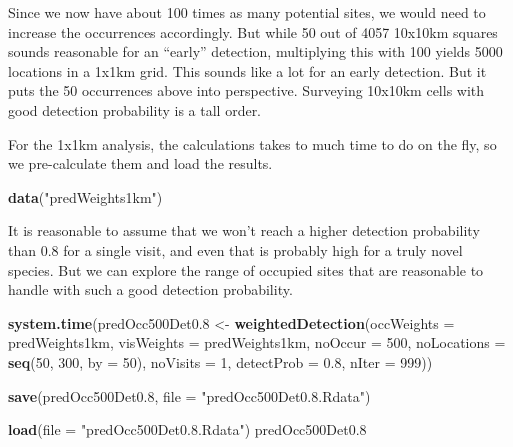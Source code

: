 \documentclass[]{article}
\newenvironment{Shaded}{\begin{snugshade}}{\end{snugshade}}
\newcommand{\KeywordTok}[1]{\textcolor[rgb]{0.13,0.29,0.53}{\textbf{#1}}}
\newcommand{\DataTypeTok}[1]{\textcolor[rgb]{0.13,0.29,0.53}{#1}}
\newcommand{\DecValTok}[1]{\textcolor[rgb]{0.00,0.00,0.81}{#1}}
\newcommand{\FloatTok}[1]{\textcolor[rgb]{0.00,0.00,0.81}{#1}}
\newcommand{\StringTok}[1]{\textcolor[rgb]{0.31,0.60,0.02}{#1}}
\newcommand{\NormalTok}[1]{#1}
\begin{document}
Since we now have about 100 times as many potential sites, we would need
to increase the occurrences accordingly. But while 50 out of 4057
10x10km squares sounds reasonable for an ``early'' detection,
multiplying this with 100 yields 5000 locations in a 1x1km grid. This
sounds like a lot for an early detection. But it puts the 50 occurrences
above into perspective. Surveying 10x10km cells with good detection
probability is a tall order.

For the 1x1km analysis, the calculations takes to much time to do on the
fly, so we pre-calculate them and load the results.

\begin{Shaded}
\begin{Highlighting}[]
\KeywordTok{data}\NormalTok{(}\StringTok{"predWeights1km"}\NormalTok{)}
\end{Highlighting}
\end{Shaded}

It is reasonable to assume that we won't reach a higher detection
probability than 0.8 for a single visit, and even that is probably high
for a truly novel species. But we can explore the range of occupied
sites that are reasonable to handle with such a good detection
probability.

\begin{Shaded}
\begin{Highlighting}[]
\KeywordTok{system.time}\NormalTok{(predOcc500Det0.}\DecValTok{8}\NormalTok{ <-}\StringTok{ }\KeywordTok{weightedDetection}\NormalTok{(}\DataTypeTok{occWeights =}\NormalTok{ predWeights1km, }
    \DataTypeTok{visWeights =}\NormalTok{ predWeights1km, }\DataTypeTok{noOccur =} \DecValTok{500}\NormalTok{, }\DataTypeTok{noLocations =} \KeywordTok{seq}\NormalTok{(}\DecValTok{50}\NormalTok{, }\DecValTok{300}\NormalTok{, }\DataTypeTok{by =} \DecValTok{50}\NormalTok{), }
    \DataTypeTok{noVisits =} \DecValTok{1}\NormalTok{, }\DataTypeTok{detectProb =} \FloatTok{0.8}\NormalTok{, }\DataTypeTok{nIter =} \DecValTok{999}\NormalTok{))}

\KeywordTok{save}\NormalTok{(predOcc500Det0.}\DecValTok{8}\NormalTok{, }\DataTypeTok{file =} \StringTok{"predOcc500Det0.8.Rdata"}\NormalTok{)}
\end{Highlighting}
\end{Shaded}

\begin{Shaded}
\begin{Highlighting}[]
\KeywordTok{load}\NormalTok{(}\DataTypeTok{file =} \StringTok{"predOcc500Det0.8.Rdata"}\NormalTok{)}
\NormalTok{predOcc500Det0.}\DecValTok{8}
\end{Highlighting}
\end{Shaded}
\end{document}
